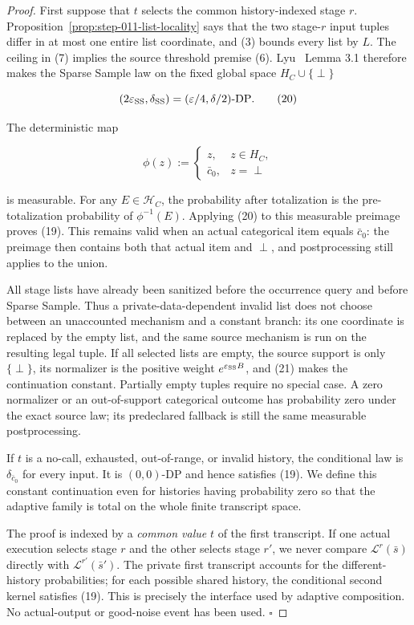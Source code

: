 \begin{proof}
First suppose that \(t\) selects the common history-indexed stage
\(r\). Proposition~\ref{prop:step-011-list-locality} says that the two
stage-\(r\) input tuples differ in at most one entire list coordinate, and
(3) bounds every list by \(L\). The ceiling in (7) implies the source
threshold premise (6). Lyu~\citep{lyu2025} Lemma 3.1 therefore makes the Sparse Sample law
on the fixed global space \(H_C\cup\{\perp\}\)

\[
 (2\varepsilon_{\rm SS},\delta_{\rm SS})
 =(\varepsilon/4,\delta/2)\text{-DP}.
\tag{20}
\]

The deterministic map

\[
 \phi(z):=
 \begin{cases}
 z,&z\in H_C,\\
 \bar c_0,&z=\perp
 \end{cases}
\tag{21}
\]

is measurable. For any \(E\in\mathcal H_C\), the probability after
totalization is the pre-totalization probability of
\(\phi^{-1}(E)\). Applying (20) to this measurable preimage proves (19).
This remains valid when an actual categorical item equals \(\bar c_0\):
the preimage then contains both that actual item and \(\perp\), and
postprocessing still applies to the union.

All stage lists have already been sanitized before the occurrence query and
before Sparse Sample. Thus a private-data-dependent invalid list does not
choose between an unaccounted mechanism and a constant branch: its one
coordinate is replaced by the empty list, and the same source mechanism is
run on the resulting legal tuple. If all selected lists are empty, the
source support is only \(\{\perp\}\), its normalizer is the positive weight
\(e^{\varepsilon_{\rm SS}B}\), and (21) makes the continuation constant.
Partially empty tuples require no special case. A zero normalizer or an
out-of-support categorical outcome has probability zero under the exact
source law; its predeclared fallback is still the same measurable
postprocessing.

If \(t\) is a no-call, exhausted, out-of-range, or invalid history, the
conditional law is \(\delta_{\bar c_0}\) for every input. It is
\((0,0)\)-DP and hence satisfies (19). We define this constant continuation
even for histories having probability zero so that the adaptive family is
total on the whole finite transcript space.

The proof is indexed by a \emph{common value} \(t\) of the first transcript. If
one actual execution selects stage \(r\) and the other selects stage \(r'\),
we never compare \(\mathcal L^r(\bar s)\) directly with
\(\mathcal L^{r'}(\bar s')\). The private first transcript accounts for the
different-history probabilities; for each possible shared history, the
conditional second kernel satisfies (19). This is precisely the interface
used by adaptive composition. No actual-output or good-noise event has been
used. \(\square\)


\end{proof}

